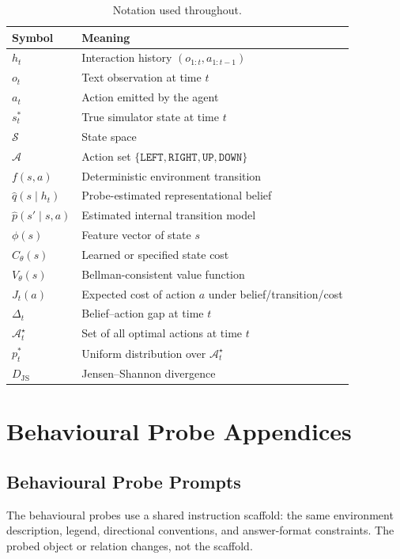 \documentclass[11pt,a4paper]{article}
\newcommand{\A}{\mathcal{A}}
\newcommand{\Sspace}{\mathcal{S}}
\newcommand{\qhat}{\hat q}
\newcommand{\phat}{\hat p}
\newcommand{\optset}{\mathcal{A}^{\star}}
\newcommand{\JS}{D_{\mathrm{JS}}}
\begin{document}
\begin{table}[h]
\centering
\small
\begin{tabularx}{\linewidth}{lX}
\toprule
Symbol & Meaning \\
\midrule
$h_t$ & Interaction history $(o_{1:t},a_{1:t-1})$ \\
$o_t$ & Text observation at time $t$ \\
$a_t$ & Action emitted by the agent \\
$s_t^*$ & True simulator state at time $t$ \\
$\Sspace$ & State space \\
$\A$ & Action set $\{\texttt{LEFT},\texttt{RIGHT},\texttt{UP},\texttt{DOWN}\}$ \\
$f(s,a)$ & Deterministic environment transition \\
$\qhat(s\mid h_t)$ & Probe-estimated representational belief \\
$\phat(s'\mid s,a)$ & Estimated internal transition model \\
$\phi(s)$ & Feature vector of state $s$ \\
$C_\theta(s)$ & Learned or specified state cost \\
$V_\theta(s)$ & Bellman-consistent value function \\
$J_t(a)$ & Expected cost of action $a$ under belief/transition/cost \\
$\Delta_t$ & Belief--action gap at time $t$ \\
$\optset_t$ & Set of all optimal actions at time $t$ \\
$p_t^*$ & Uniform distribution over $\optset_t$ \\
$\JS$ & Jensen--Shannon divergence \\
\bottomrule
\end{tabularx}
\caption{Notation used throughout.}
\end{table}

\clearpage
\appendix
\section{Behavioural Probe Appendices}

\subsection{Behavioural Probe Prompts}
The behavioural probes use a shared instruction scaffold: the same environment description, legend, directional conventions, and answer-format constraints. The probed object or relation changes, not the scaffold.
\end{document}
